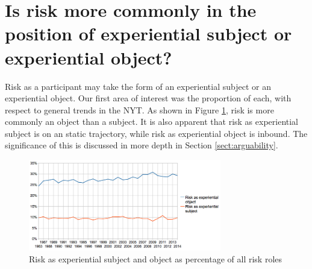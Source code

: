 		

		\section{Is risk more commonly in the position of experiential subject or experiential object?} 
		\FloatBarrier

		Risk as a participant may take the form of an experiential subject or an experiential object. Our first area of interest was the proportion of each, with respect to general trends in the NYT. As shown in Figure \ref{fig:bestexpsubjobj}, risk is more commonly an object than a subject. It is also apparent that risk as experiential subject is on an static trajectory, while risk as experiential object is inbound. The significance of this is discussed in more depth in Section \ref{sect:arguability}.

			\begin{figure}[htb!]
			\centering
			\includegraphics[width=0.75\textwidth]{../images/bestexpsubjobj.png}
			\caption{Risk as experiential subject and object as percentage of all risk roles}
			\label{fig:bestexpsubjobj}
			\end{figure}

